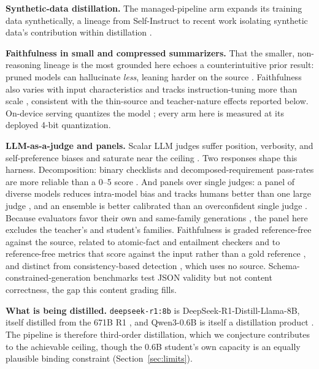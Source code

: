 \documentclass[10pt,journal]{IEEEtran}
\begin{document}
\textbf{Synthetic-data distillation.} The managed-pipeline arm expands its training data synthetically, a lineage from Self-Instruct \cite{wang2023selfinstruct} to recent work isolating synthetic data's contribution within distillation \cite{shirgaonkar2024}.

\textbf{Faithfulness in small and compressed summarizers.} That the smaller, non-reasoning lineage is the most grounded here echoes a counterintuitive prior result: pruned models can hallucinate \emph{less}, leaning harder on the source \cite{chrysostomou2023}. Faithfulness also varies with input characteristics \cite{ramprasad2024} and tracks instruction-tuning more than scale \cite{zhang2023newssumm}, consistent with the thin-source and teacher-nature effects reported below. On-device serving quantizes the model \cite{song2025ondevice, lin2023awq}; every arm here is measured at its deployed 4-bit quantization.

\textbf{LLM-as-a-judge and panels.} Scalar LLM judges suffer position, verbosity, and self-preference biases and saturate near the ceiling \cite{zheng2023mtbench, wang2023unfair, ye2024bias, liu2023}. Two responses shape this harness. Decomposition: binary checklists and decomposed-requirement pass-rates are more reliable than a 0--5 score \cite{lee2024, cook2024tick, qin2024infobench}. And panels over single judges: a panel of diverse models reduces intra-model bias and tracks humans better than one large judge \cite{verga2024poll}, and an ensemble is better calibrated than an overconfident single judge \cite{tian2025overconfidence}. Because evaluators favor their own and same-family generations \cite{panickssery2024, wataoka2024}, the panel here excludes the teacher's and student's families. Faithfulness is graded reference-free against the source, related to atomic-fact and entailment checkers \cite{min2023, tang2024} and to reference-free metrics that score against the input rather than a gold reference \cite{jiang2023tigerscore}, and distinct from consistency-based detection \cite{manakul2023}, which uses no source. Schema-constrained-generation benchmarks test JSON validity \cite{geng2025jsonschema} but not content correctness, the gap this content grading fills.

\textbf{What is being distilled.} \texttt{deepseek-r1:8b} is DeepSeek-R1-Distill-Llama-8B, itself distilled from the 671B R1 \cite{deepseek2025}, and Qwen3-0.6B is itself a distillation product \cite{yang2025}. The pipeline is therefore third-order distillation, which we conjecture contributes to the achievable ceiling, though the 0.6B student's own capacity is an equally plausible binding constraint (Section~\ref{sec:limits}).
\end{document}
